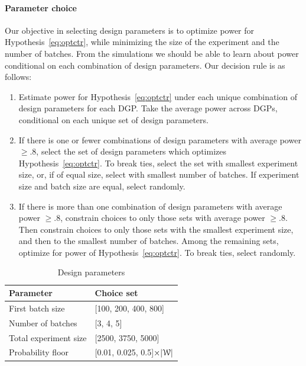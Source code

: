 \documentclass[letterpaper, 12pt, parskip=full,]{scrartcl}
\begin{document}
\paragraph{Parameter choice}
Our objective in selecting design parameters is to optimize power for Hypothesis~\ref{eq:optctr}, while minimizing the size of the experiment and the number of batches. From the simulations we should be able to learn about power conditional on each combination of design parameters. Our decision rule is as follows:
\begin{enumerate}
\item Estimate power for Hypothesis~\ref{eq:optctr} under each unique combination of design parameters for each DGP. Take the average power across DGPs, conditional on each unique set of design parameters. 
\item If there is one or fewer combinations of design parameters with average power $\ge.8$, select the set of design parameters which optimizes Hypothesis~\ref{eq:optctr}. To break ties, select the set with smallest experiment size, or, if of equal size, select with smallest number of batches. If experiment size and batch size are equal, select randomly. 
\item If there is more than one combination of design parameters with average power $\ge.8$, constrain choices to only those sets with average power $\ge.8$. Then constrain choices to only those sets with the smallest experiment size, and then to the smallest number of batches. Among the remaining sets, optimize for power of Hypothesis~\ref{eq:optctr}. To break ties, select randomly. 
\end{enumerate}

\begin{table}[H]
\centering
\caption{Design parameters} 
\label{tab:design}
\begin{tabular}{l | l}
\textbf{Parameter} & \textbf{Choice set} \\ \hline
First batch size & [100, 200, 400, 800] \\
Number of batches & [3, 4, 5] \\
Total experiment size & [2500, 3750, 5000] \\
Probability floor & [0.01, 0.025, 0.5]$\times |{\EuScript W}|$ \\
\hline
\end{tabular}
\end{table} 
\end{document}
